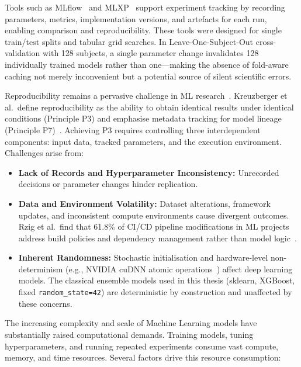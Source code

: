 Tools such as MLflow~\cite{zaharia2018mlflow} and MLXP~\cite{arbel2024mlxp} support experiment tracking by recording parameters, metrics, implementation versions, and artefacts for each run, enabling comparison and reproducibility. These tools were designed for single train/test splits and tabular grid searches. In Leave-One-Subject-Out cross-validation with 128 subjects, a single parameter change invalidates 128 individually trained models rather than one—making the absence of fold-aware caching not merely inconvenient but a potential source of silent scientific errors.

Reproducibility remains a pervasive challenge in ML research~\cite{semmelrock2025reproducibility}. Kreuzberger et al.\ define reproducibility as the ability to obtain identical results under identical conditions (Principle P3) and emphasise metadata tracking for model lineage (Principle P7)~\cite{kreuzberger2023mlops}. Achieving P3 requires controlling three interdependent components: input data, tracked parameters, and the execution environment. Challenges arise from:

\begin{itemize}
 \item \textbf{Lack of Records and Hyperparameter Inconsistency:} Unrecorded decisions or parameter changes hinder replication.
 \item \textbf{Data and Environment Volatility:} Dataset alterations, framework updates, and inconsistent compute environments cause divergent outcomes. Rzig et al.\ find that 61.8\% of CI/CD pipeline modifications in ML projects address build policies and dependency management rather than model logic~\cite{rzig2024empirical}.
 \item \textbf{Inherent Randomness:} Stochastic initialisation and hardware-level non-determinism (e.g., NVIDIA cuDNN atomic operations~\cite{nvidia2024cudnn}) affect deep learning models. The classical ensemble models used in this thesis (sklearn, XGBoost, fixed \texttt{random\_state=42}) are deterministic by construction and unaffected by these concerns.
\end{itemize}

The increasing complexity and scale of Machine Learning models have substantially raised computational demands. Training models, tuning hyperparameters, and running repeated experiments consume vast compute, memory, and time resources. Several factors drive this resource consumption:

